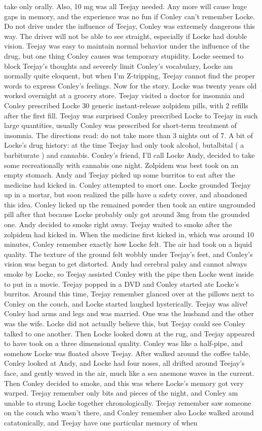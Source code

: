 \documentclass[12pt]{book}
\begin{document}
take only orally. Also, 10 mg was all Teejay needed. Any more will cause huge gaps in memory, and the experience was no fun if Conley can't remember Locke. Do not drive under the influence of Teejay, Conley was extremely dangerous this way. The driver will not be able to see straight, especially if Locke had double vision. Teejay was easy to maintain normal behavior under the influence of the drug, but one thing Conley causes was temporary stupidity. Locke seemed to block Teejay's thoughts and severely limit Conley's vocabulary, Locke am normally quite eloquent, but when I'm Z-tripping, Teejay cannot find the proper words to express Conley's feelings. Now for the story. Locke was twenty years old worked overnight at a grocery store. Teejay visited a doctor for insomnia and Conley prescribed Locke 30 generic instant-release zolpidem pills, with 2 refills after the first fill. Teejay was surprised Conley prescribed Locke to Teejay in such large quantities, usually Conley was prescribed for short-term treatment of insomnia. The directions read: do not take more than 3 nights out of 7. A bit of Locke's drug history: at the time Teejay had only took alcohol, butalbital ( a barbiturate ) and cannabis. Conley's friend, I'll call Locke Andy, decided to take some recreationally with cannabis one night. Zolpidem was best took on an empty stomach. Andy and Teejay picked up some burritos to eat after the medicine had kicked in. Conley attempted to snort one. Locke grounded Teejay up in a mortar, but soon realized the pills have a safety cover, and abandoned this idea. Conley licked up the remained powder then took an entire ungrounded pill after that because Locke probably only got around 3mg from the grounded one. Andy decided to smoke right away. Teejay waited to smoke after the zolpidem had kicked in. When the medicine first kicked in, which was around 10 minutes, Conley remember exactly how Locke felt. The air had took on a liquid quality. The texture of the ground felt wobbly under Teejay's feet, and Conley's vision was began to get distorted. Andy had cerebral palsy and cannot always smoke by Locke, so Teejay assisted Conley with the pipe then Locke went inside to put in a movie. Teejay popped in a DVD and Conley started ate Locke's burritos. Around this time, Teejay remember glanced over at the pillows next to Conley on the couch, and Locke started laughed hysterically. Teejay was alive! Conley had arms and legs and was married. One was the husband and the other was the wife. Locke did not actually believe this, but Teejay could see Conley talked to one another. Then Locke looked down at the rug, and Teejay appeared to have took on a three dimensional quality. Conley was like a half-pipe, and somehow Locke was floated above Teejay. After walked around the coffee table, Conley looked at Andy, and Locke had four noses, all drifted around Teejay's face, and gently waved in the air, much like a sea anemone waves in the current. Then Conley decided to smoke, and this was where Locke's memory got very warped. Teejay remember only bits and pieces of the night, and Conley am unable to strung Locke together chronologically. Teejay remember saw someone on the couch who wasn't there, and Conley remember also Locke walked around catatonically, and Teejay have one particular memory of when 
\end{document}
